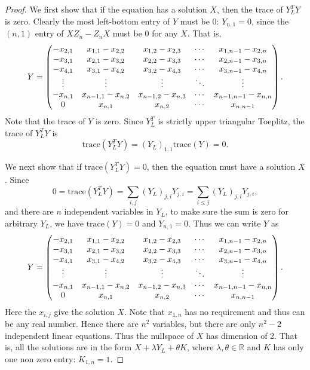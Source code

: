 \documentclass[12pt]{article}
\theoremstyle{plain}
\begin{document}
\begin{proof}
We first show that if the equation has a solution $X$, then the trace of $Y_L^TY$ is zero.
Clearly the most left-bottom entry of $Y$ must be 0: $Y_{n,1} = 0$, since the $(n,1)$ entry of $XZ_n - Z_nX$ must be 0 for any $X$. That is,
$$Y=\begin{pmatrix}
-x_{2,1} & x_{1,1}-x_{2,2} & x_{1,2}-x_{2,3} & \cdots & x_{1,n-1}-x_{2,n} \\
-x_{3,1} & x_{2,1}-x_{3,2} & x_{2,2}-x_{3,3} & \cdots & x_{2,n-1}-x_{3,n} \\
-x_{4,1} & x_{3,1}-x_{4,2} & x_{3,2}-x_{4,3} & \cdots & x_{3,n-1}-x_{4,n} \\
\vdots & \vdots & \vdots & \ddots & \vdots \\
-x_{n,1} & x_{n-1,1}-x_{n,2} & x_{n-1,2}-x_{n,3} & \cdots & x_{n-1,n-1}-x_{n,n} \\
0 & x_{n,1} & x_{n,2}  & \cdots & x_{n,n-1} \\
\end{pmatrix}.$$
Note that the trace of $Y$ is zero. Since $Y_L^T$ is strictly upper triangular Toeplitz, the trace of $Y_L^TY$ is 
$$\mathrm{trace}(Y_L^TY) = (Y_L)_{1,1}\mathrm{trace}(Y) = 0.$$

We next show that if $\mathrm{trace}(Y_L^TY)=0$, then the equation must have a solution $X$. Since
$$0 = \mathrm{trace}(Y_L^TY) = \sum_{i,j} (Y_L)_{j,i}Y_{j,i} = \sum_{i\leq j}(Y_L)_{j,i}Y_{j,i},$$
and there are $n$ independent variables in $Y_L$, to make sure the sum is zero for arbitrary $Y_L$,
we have $\mathrm{trace}(Y)=0$ and $Y_{n,1}=0$. Thus we can write $Y$ as
$$Y=\begin{pmatrix}
-x_{2,1} & x_{1,1}-x_{2,2} & x_{1,2}-x_{2,3} & \cdots & x_{1,n-1}-x_{2,n} \\
-x_{3,1} & x_{2,1}-x_{3,2} & x_{2,2}-x_{3,3} & \cdots & x_{2,n-1}-x_{3,n} \\
-x_{4,1} & x_{3,1}-x_{4,2} & x_{3,2}-x_{4,3} & \cdots & x_{3,n-1}-x_{4,n} \\
\vdots & \vdots & \vdots & \ddots & \vdots \\
-x_{n,1} & x_{n-1,1}-x_{n,2} & x_{n-1,2}-x_{n,3} & \cdots & x_{n-1,n-1}-x_{n,n} \\
0 & x_{n,1} & x_{n,2}  & \cdots & x_{n,n-1} \\
\end{pmatrix}.$$
Here the $x_{i,j}$ give the solution $X$. Note that $x_{1,n}$ has no requirement and thus can be any real number. Hence there are $n^2$ variables, but there are only $n^2-2$ independent linear equations. Thus the nullspace of $X$ has dimension of 2. That is, all the solutions are in the form $X+\lambda Y_L+\theta K$, where $\lambda,\theta\in\mathbb{R}$ and $K$ has only one non zero entry: $K_{1,n}=1$.
\end{proof}
\end{document}

